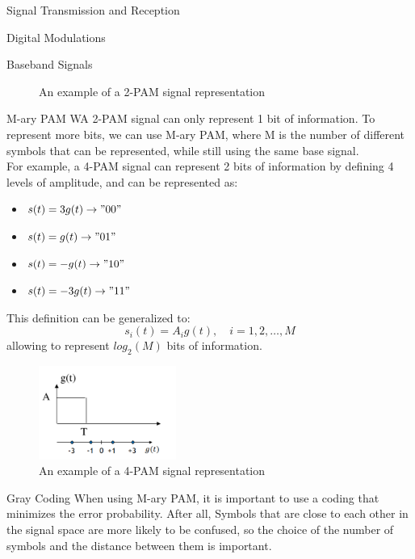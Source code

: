 \begin{section}{Signal Transmission and Reception}
\begin{subsection}{Digital Modulations}
\begin{subsubsection}{Baseband Signals}
\begin{figure}[h]
        \caption{An example of a 2-PAM signal representation}
        \label{fig:PAM}
      \end{figure}
    \end{subsubsection}
    \begin{subsubsection}{M-ary PAM}
      WA 2-PAM signal can only represent 1 bit of information. To represent more bits, we can use
      M-ary PAM, where M is the number of different symbols that can be represented, while still
      using the same base signal.\\
      For example, a 4-PAM signal can represent 2 bits of information by defining 4 levels of
      amplitude, and can be represented as:
      \begin{itemize}
        \item $s(t)=3g(t) \to "00"$
        \item $s(t)=g(t) \to "01"$
        \item $s(t)=-g(t) \to "10"$
        \item $s(t)=-3g(t) \to "11"$
      \end{itemize}
      This definition can be generalized to:
      \begin{equation}
        s_i(t)=A_i g(t),\quad i=1,2,\dots,M
      \end{equation}
      allowing to represent $log_2(M)$ bits of information.\\
      \begin{figure}[h]
        \centering
        \includegraphics[width=0.4\textwidth]{img/wireless/M-PAM.png}
        \caption{An example of a 4-PAM signal representation}
        \label{fig:4-PAM}
      \end{figure}
    \end{subsubsection}
    \begin{subsubsection}{Gray Coding}
      When using M-ary PAM, it is important to use a coding that minimizes the error probability.
      After all, Symbols that are close to each other in the signal space are more likely to be 
      confused, so the choice of the number of symbols and the distance between them is 
      important.\\

\end{subsubsection}
\end{subsection}
\end{section}
